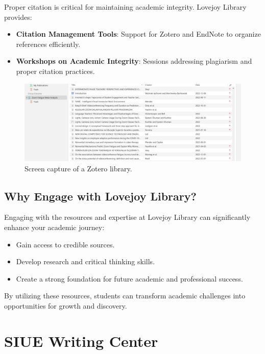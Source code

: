 \documentclass[
]{book}
\providecommand{\tightlist}{%
  \setlength{\itemsep}{0pt}\setlength{\parskip}{0pt}}
\begin{document}
Proper citation is critical for maintaining academic integrity. Lovejoy Library provides:

\begin{itemize}
\tightlist
\item
  \textbf{Citation Management Tools}: Support for Zotero and EndNote to organize references efficiently.
\item
  \textbf{Workshops on Academic Integrity}: Sessions addressing plagiarism and proper citation practices.
\end{itemize}

\begin{figure}
\centering
\includegraphics[width=1\linewidth,height=\textheight,keepaspectratio]{images/zotero-library.png}
\caption{Screen capture of a Zotero library.}
\end{figure}

\subsection*{Why Engage with Lovejoy Library?}\label{why-engage-with-lovejoy-library}

Engaging with the resources and expertise at Lovejoy Library can significantly enhance your academic journey:

\begin{itemize}
\tightlist
\item
  Gain access to credible sources.
\item
  Develop research and critical thinking skills.
\item
  Create a strong foundation for future academic and professional success.
\end{itemize}

By utilizing these resources, students can transform academic challenges into opportunities for growth and discovery.

\section{SIUE Writing Center}\label{siue-writing-center}
\end{document}

